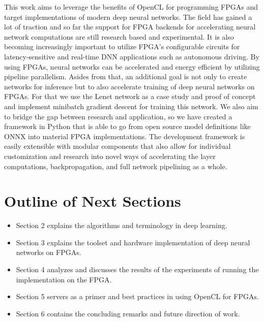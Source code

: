 This work aims to leverage the benefits of OpenCL for programming FPGAs and target implementations of modern deep neural networks. The field has gained a lot of traction and so far the support for FPGA backends for accelerating neural network computations are still research based and experimental. It is also becoming increasingly important to utilize FPGA's configurable circuits for latency-sensitive and real-time DNN applications such as autonomous driving. By using FPGAs, neural networks can be accelerated and energy efficient by utilizing pipeline parallelism. Asides from that, an additional goal is not only to create networks for inference but to also accelerate training of deep neural networks on FPGAs. For that we use the Lenet network as a case study and proof of concept and implement minibatch gradient descent for training this network. We also aim to bridge the gap between research and application, so we have created a framework in Python that is able to go from open source model definitions like ONNX into material FPGA implementations. The development framework is easily extensible with modular components that also allow for individual customization and research into novel ways of accelerating the layer computations, backpropagation, and full network pipelining as a whole. 


\section{Outline of Next Sections}

\begin{itemize}

\item Section 2 explains the algorithms and terminology in deep learning. 

\item Section 3 explains the toolset and hardware implementation of deep neural networks on FPGAs.

\item Section 4 analyzes and discusses the results of the experiments of running the implementation on the FPGA.

\item Section 5 servers as a primer and best practices in using OpenCL for FPGAs.

\item Section 6 contains the concluding remarks and future direction of work.

\end{itemize}


